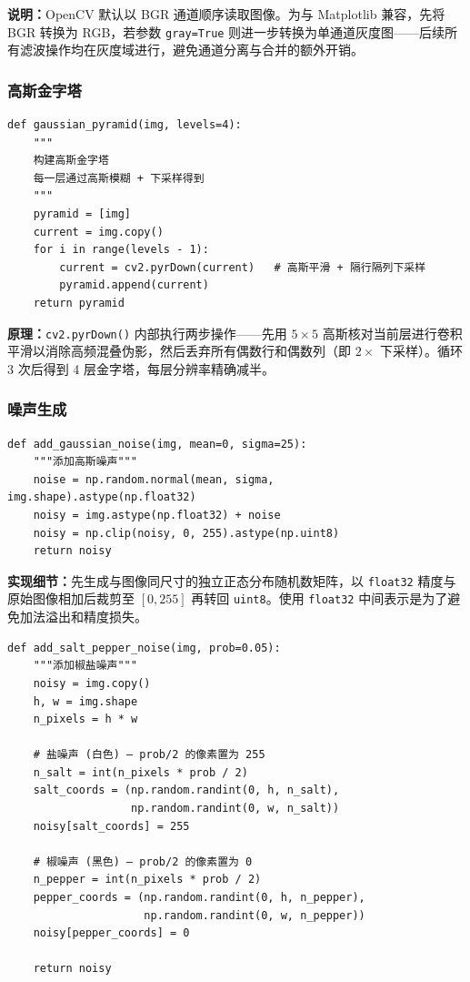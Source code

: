 \documentclass[12pt,a4paper]{ctexart}
\begin{document}
\textbf{说明：}OpenCV 默认以 BGR 通道顺序读取图像。为与 Matplotlib 兼容，先将 BGR 转换为 RGB，若参数 \texttt{gray=True} 则进一步转换为单通道灰度图——后续所有滤波操作均在灰度域进行，避免通道分离与合并的额外开销。

\subsubsection*{高斯金字塔}

\begin{lstlisting}[caption={高斯金字塔构建}, label=lst:pyramid]
def gaussian_pyramid(img, levels=4):
    """
    构建高斯金字塔
    每一层通过高斯模糊 + 下采样得到
    """
    pyramid = [img]
    current = img.copy()
    for i in range(levels - 1):
        current = cv2.pyrDown(current)   # 高斯平滑 + 隔行隔列下采样
        pyramid.append(current)
    return pyramid
\end{lstlisting}

\textbf{原理：}\texttt{cv2.pyrDown()} 内部执行两步操作——先用 $5\times5$ 高斯核对当前层进行卷积平滑以消除高频混叠伪影，然后丢弃所有偶数行和偶数列（即 $2\times$ 下采样）。循环 3 次后得到 4 层金字塔，每层分辨率精确减半。

\subsubsection*{噪声生成}

\begin{lstlisting}[caption={高斯噪声生成}, label=lst:gnoise]
def add_gaussian_noise(img, mean=0, sigma=25):
    """添加高斯噪声"""
    noise = np.random.normal(mean, sigma, img.shape).astype(np.float32)
    noisy = img.astype(np.float32) + noise
    noisy = np.clip(noisy, 0, 255).astype(np.uint8)
    return noisy
\end{lstlisting}

\textbf{实现细节：}先生成与图像同尺寸的独立正态分布随机数矩阵，以 \texttt{float32} 精度与原始图像相加后裁剪至 $[0,255]$ 再转回 \texttt{uint8}。使用 \texttt{float32} 中间表示是为了避免加法溢出和精度损失。

\begin{lstlisting}[caption={椒盐噪声生成}, label=lst:spnoise]
def add_salt_pepper_noise(img, prob=0.05):
    """添加椒盐噪声"""
    noisy = img.copy()
    h, w = img.shape
    n_pixels = h * w

    # 盐噪声 (白色) — prob/2 的像素置为 255
    n_salt = int(n_pixels * prob / 2)
    salt_coords = (np.random.randint(0, h, n_salt),
                   np.random.randint(0, w, n_salt))
    noisy[salt_coords] = 255

    # 椒噪声 (黑色) — prob/2 的像素置为 0
    n_pepper = int(n_pixels * prob / 2)
    pepper_coords = (np.random.randint(0, h, n_pepper),
                     np.random.randint(0, w, n_pepper))
    noisy[pepper_coords] = 0

    return noisy
\end{lstlisting}
\end{document}
